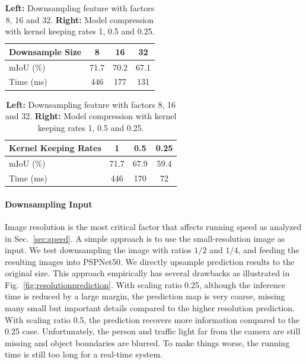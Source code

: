 \documentclass[runningheads]{llncs}
\begin{document}
\begin{table}[bpt]
	\caption{\textbf{Left:} Downsampling feature with factors 8, 16 and 32. \textbf{Right:} Model compression with kernel keeping rates 1, 0.5 and 0.25.}
	\label{tab:timedownsamplesize-timemodelcompression}
	\begin{minipage}[t]{0.48\linewidth}
		\centering
		\setlength{\tabcolsep}{3pt}
		\begin{tabular}{l | c c c}
			\toprule[1pt]
			Downsample Size & 8 & 16 & 32 \\
			\hline
			\hline
			mIoU (\%) & 71.7 & 70.2 & 67.1 \\
			Time (ms) & 446 & 177 & 131 \\
			\bottomrule[1pt]
		\end{tabular}
	\end{minipage}
	\hfill
	\begin{minipage}[t]{0.48\linewidth}
		\centering
		\setlength{\tabcolsep}{3pt}
		\begin{tabular}{l | c c c}
			\toprule[1pt]
			Kernel Keeping Rates & 1 & 0.5 & 0.25 \\
			\hline
			\hline
			mIoU (\%) & 71.7 & 67.9 & 59.4 \\
			Time (ms) & 446 & 170 & 72 \\
			\bottomrule[1pt]
		\end{tabular}
	\end{minipage}
\end{table}

\paragraph{Downsampling Input}
Image resolution is the most critical factor that affects running speed as analyzed in Sec.~\ref{sec:speed}. A simple approach is to use the small-resolution image as input. We test downsampling the image with ratios $1/2$ and $1/4$, and feeding the resulting images into PSPNet50. We directly upsample prediction results to the original size. This approach empirically has several drawbacks as illustrated in Fig.~\ref{fig:resolutionprediction}. With scaling ratio 0.25, although the inference time is reduced by a large margin, the prediction map is very coarse, missing many small but important details compared to the higher resolution prediction. With scaling ratio 0.5, the prediction recovers more information compared to the 0.25 case. Unfortunately, the person and traffic light far from the camera are still missing and object boundaries are blurred. To make things worse, the running time is still too long for a real-time system.
\end{document}
